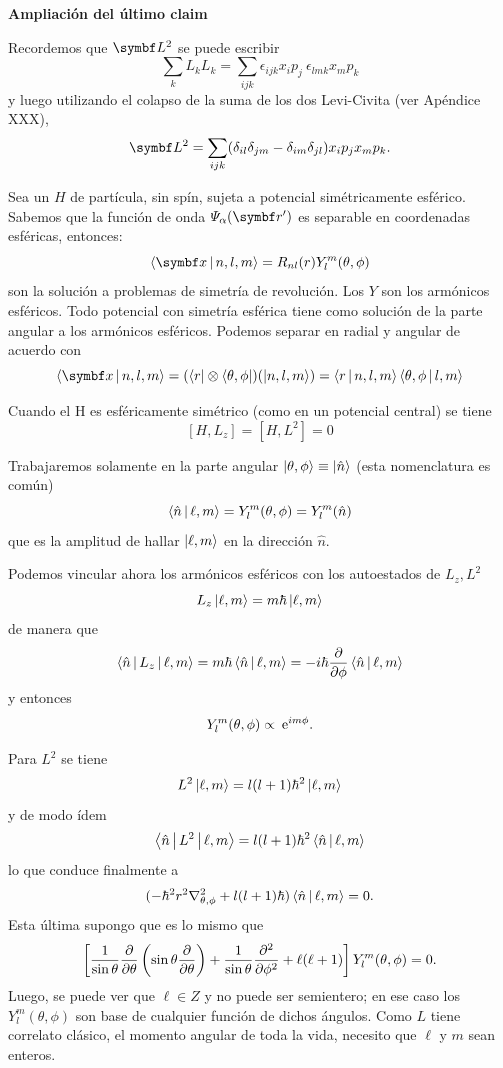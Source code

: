 \documentclass[10pt,oneside]{CBFT_book}
\begin{document}
\begin{ejemplo}{\bf Ampliación del último claim}

Recordemos que $\vb{L}^2$ se puede escribir
\[
	\sum_k L_k L_k = \sum_{ijk} \epsilon_{ijk} x_i p_j \: \epsilon_{lmk} x_m p_k
\]
y luego utilizando el colapso de la suma de los dos Levi-Civita (ver Apéndice XXX),
\[
	\vb{L}^2 = \sum_{ijk} ( \delta_{il}\delta_{jm} - \delta_{im}\delta_{jl} ) 
	x_i p_j x_m p_k.
\]
 
\end{ejemplo}


Sea un $H$ de partícula, sin spín, sujeta a potencial simétricamente esférico. Sabemos que la función de onda 
$\Psi_\alpha(\vb{r}')$ es separable en coordenadas esféricas, entonces:
\[
	\Braket{ \vbx |n,l,m} = R_{nl}(r)Y_l^m(\theta,\phi)
\]
son la solución a problemas de simetría de revolución. 
Los $Y$ son los armónicos esféricos. Todo potencial con simetría esférica tiene como solución
de la parte angular a los armónicos esféricos.
Podemos separar en radial y angular de acuerdo con
\[
	\Braket{ \vbx |n,l,m} = (\Bra{{r}}\otimes\Bra{\theta,\phi})(\Ket{n,l,m})=
	\Braket{r|n,l,m}\Braket{\theta,\phi|l,m}
\]

Cuando el H es esféricamente simétrico (como en un potencial central) se tiene 
\[
	[H,L_z] = [H,L^2] = 0
\]

Trabajaremos solamente en la parte angular  $\Ket{\theta,\phi} \equiv \Ket{\hat{n}}$
(esta nomenclatura es común)
\[
	\Braket{\hat{n}|\ell,m} = Y_l^m(\theta,\phi) = Y_l^m(\hat{n})
\]
que es la amplitud de hallar $\Ket{\ell,m}$ en la dirección $\hat{n}$.

Podemos vincular ahora los armónicos esféricos con los autoestados de $L_z,L^2$
\[
	L_z \Ket{\ell,m} = m\hbar\Ket{\ell,m}
\]
de manera que 
\[
	\Braket{\hat{n}|L_z|\ell,m} = m\hbar \Braket{\hat{n}|\ell,m} =
	-i\hbar \dpar{}{\phi} \Braket{\hat{n}|\ell,m}
\]
y entonces 
\[
	Y_l^m(\theta,\phi) \propto \euler^{im\phi}.
\]

Para $L^2$ se tiene
\[
	L^2 \Ket{\ell,m} = l(l+1)\hbar^2\Ket{\ell,m}
\]
y de modo ídem
\[
	\Braket{\hat{n}|L^2|\ell,m} = l(l+1)\hbar^2\Braket{\hat{n}|\ell,m}
\]
lo que conduce finalmente a
\[
	( -\hbar^2 r^2 \nabla^2_{\theta,\phi} + l(l+1)\hbar )\Braket{\hat{n}|\ell,m} = 0.
\]
Esta última supongo que es lo mismo que
\[
	\left[ \frac{1}{\sin\theta} \dpar{}{\theta}\left(\sin\theta\dpar{}{\theta}\right)
	+ \frac{1}{\sin\theta} \dpar[2]{}{\phi} + \ell (\ell+1)
	\right] Y_l^m(\theta,\phi) = 0.
\]
Luego, se puede ver que $\ell\in Z$ y no puede ser semientero; en ese caso los $ Y_l^m(\theta,\phi)$
son base de cualquier función de dichos ángulos.
Como $L$ tiene correlato clásico, el momento angular de toda la vida, necesito que $\ell$ y $m$ sean 
enteros.
\end{document}
